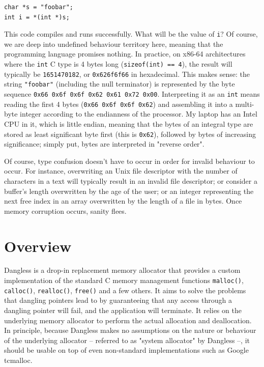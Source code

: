 \begin{lstlisting}
char *s = "foobar";
int i = *(int *)s;
\end{lstlisting}

This code compiles and runs successfully. What will be the value of \lstinline!i!? Of course, we are deep into undefined behaviour territory here, meaning that the programming language promises nothing. In practice, on x86-64 architectures where the \lstinline!int! C type is 4 bytes long (\lstinline!sizeof(int) == 4!), the result will typically be \texttt{1651470182}, or \texttt{0x626f6f66} in hexadecimal. This makes sense: the string \lstinline!"foobar"! (including the null terminator) is represented by the byte sequence \texttt{0x66 0x6f 0x6f 0x62 0x61 0x72 0x00}. Interpreting it as an \lstinline!int! means reading the first 4 bytes (\texttt{0x66 0x6f 0x6f 0x62}) and assembling it into a multi-byte integer according to the endianness of the processor. My laptop has an Intel CPU in it, which is little endian, meaning that the bytes of an integral type are stored as least significant byte first (this is \texttt{0x62}), followed by bytes of increasing significance; simply put, bytes are interpreted in "reverse order".

Of course, type confusion doesn't have to occur in order for invalid behaviour to occur. For instance, overwriting an Unix file descriptor with the number of characters in a text will typically result in an invalid file descriptor; or consider a buffer's length overwritten by the age of the user; or an integer representing the next free index in an array overwritten by the length of a file in bytes. Once memory corruption occurs, sanity flees.

\section{Overview}

Dangless is a drop-in replacement memory allocator that provides a custom implementation of the standard C memory management functions \lstinline!malloc()!, \lstinline!calloc()!, \lstinline!realloc()!, \lstinline!free()! and a few others. It aims to solve the problems that dangling pointers lead to by guaranteeing that any access through a dangling pointer will fail, and the application will terminate. It relies on the underlying memory allocator to perform the actual allocation and deallocation. In principle, because Dangless makes no assumptions on the nature or behaviour of the underlying allocator -- referred to as "system allocator" by Dangless --, it should be usable on top of even non-standard implementations such as Google tcmalloc.

